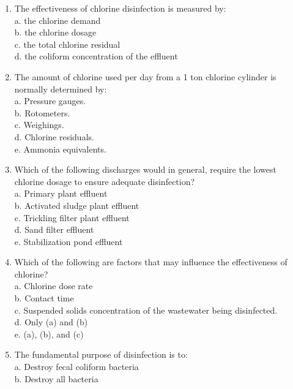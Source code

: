 \begin{tcolorbox}[breakable, enhanced,
colframe=blue!25,
colback=blue!10,
coltitle=blue!20!black,  
title= Chapter Assessment]
\begin{enumerate}
c. the chlorine remaining after disinfection. \\
d. the chlorine that displays no disinfection power. \\
e. the residue left after the evaporation of chlorine gas. \\
\item The effectiveness of chlorine disinfection is measured by: \\
a. the chlorine demand \\
b. the chlorine dosage \\
c. the total chlorine residual \\
d. the coliform concentration of the effluent \\
\item The amount of chlorine used per day from a 1 ton chlorine cylinder is normally determined by: \\
a. Pressure gauges. \\
b. Rotometers. \\
c. Weighings. \\
d. Chlorine residuals. \\
e. Ammonia equivalents. \\
\item Which of the following discharges would in general, require the lowest chlorine dosage to ensure adequate disinfection? \\
a. Primary plant effluent \\
b. Activated sludge plant effluent \\
c. Trickling filter plant effluent \\
d. Sand filter effluent \\
e. Stabilization pond effluent \\
\item Which of the following are factors that may influence the effectiveness of chlorine? \\
a. Chlorine dose rate \\
b. Contact time \\
c. Suspended solids concentration of the wastewater being disinfected. \\
d. Only (a) and (b) \\
e. (a), (b), and (c) \\
\item The fundamental purpose of disinfection is to: \\
a. Destroy fecal coliform bacteria \\
b. Destroy all bacteria \\

\end{enumerate}
\end{tcolorbox}
